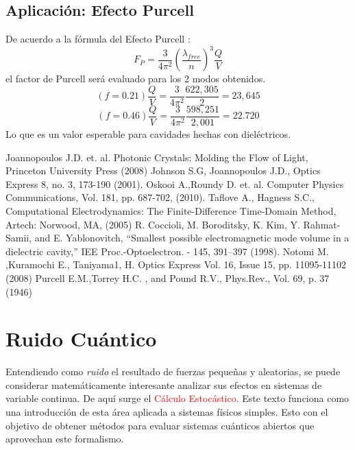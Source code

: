 \documentclass{book}
\begin{document}
\section{Aplicación: Efecto Purcell}
De acuerdo a la fórmula del Efecto Purcell \textcolor{red}{\cite{Purcell}}:
\begin{equation}\label{eq5.4} F_P=\frac{3}{4\pi^2}(\frac{\lambda_{free}}{n})^3\frac{Q}{V}\end{equation}
el factor de Purcell será evaluado para los 2 modos obtenidos.
\begin{equation}\label{eq5.5}(f=0.21)\frac{Q}{V}=\frac{3}{4\pi^2}\frac{622,305}{2}=23,645\end{equation}
\begin{equation}\label{eq5.6}(f=0.46)\frac{Q}{V}=\frac{3}{4\pi^2}\frac{598,251}{2,001}=22.720\end{equation}
Lo que es un valor esperable para cavidades hechas con dieléctricos.
\begin{thebibliography}{XXX0000}
   Joannopoulos J.D. et. al. Photonic Crystals: Molding the Flow of Light, Princeton University Press (2008)
   Johnson S.G, Joannopoulos J.D., Optics Express 8, no. 3, 173-190 (2001).
   Oskooi A.,Roundy D. et. al. Computer Physics Communications, Vol. 181, pp. 687-702, (2010).
   Taflove A., Hagness S.C., Computational Electrodynamics: The Finite-Difference Time-Domain Method, Artech: Norwood, MA, (2005)
   R. Coccioli, M. Boroditsky, K. Kim, Y. Rahmat-Samii, and E. Yablonovitch, “Smallest
possible electromagnetic mode volume in a dielectric cavity,” IEE Proc.-Optoelectron.
- 145, 391–397 (1998).
   Notomi M. ,Kuramochi E., Taniyama1, H. Optics Express Vol. 16, Issue 15, pp. 11095-11102 (2008)
   Purcell E.M.,Torrey H.C. , and Pound R.V., Phys.Rev., Vol. 69, p. 37 (1946)
\end{thebibliography}
\chapter{Ruido Cuántico}
Entendiendo como \textit{ruido} el resultado de fuerzas pequeñas y aleatorias, se puede considerar matemáticamente interesante analizar sus efectos en sistemas de variable continua. De aquí surge el \textcolor{red}{Cálculo Estocástico}.
Este texto funciona como una introducción de esta área aplicada a sistemas físicos simples. Esto con el objetivo de obtener métodos para evaluar sistemas cuánticos abiertos que aprovechan este formalismo.
\end{document}
